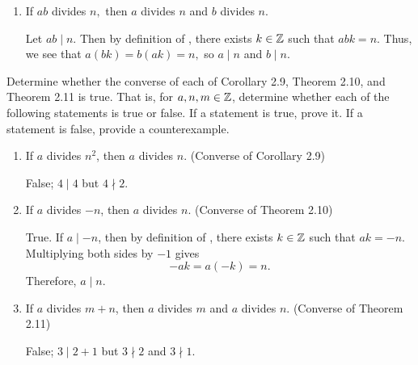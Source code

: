 \documentclass{../ximera}
\begin{document}
\begin{pre}
\begin{problem}[Problem 2.8]
\begin{enumerate}
            \item If $ab$ divides $n,$ then $a$ divides $n$ and $b$ divides $n$.
              \begin{solution}
                Let $ab\mid n$. Then by definition of , there exists $k\in\mathbb Z$ such that $abk=n$. Thus, we see that $a(bk)=b(ak)=n,$ so $a\mid n$ and $b\mid n$. 
              \end{solution}
          \end{enumerate}
        \end{problem}
    
        \begin{problem}[Problem 2.12] Determine whether the converse of each of Corollary 2.9, Theorem 2.10, and Theorem 2.11 is true. That is, for $a,n,m\in\mathbb Z$, determine whether each of the following statements is true or false. If a statement is true, prove it. If a statement is false, provide a counterexample.
        \begin{enumerate}%
          \item If $a$ divides $n^2$, then $a$ divides $n$. (Converse of Corollary 2.9)
          \begin{solution}
            False; $4\mid 4$ but $4\nmid 2$.
          \end{solution}

          \item If $a$ divides $-n$, then $a$ divides $n$. (Converse of Theorem 2.10)
            \begin{solution}
              True. If $a\mid -n$, then by definition of , there exists $k\in\mathbb Z$ such that $ak=-n$. Multiplying both sides by $-1$ gives \[-ak=a(-k)=n.\] Therefore, $a\mid n$.
            \end{solution}

          \item If $a$ divides $m+n$, then $a$ divides $m$ and $a$ divides $n$.
          (Converse of Theorem 2.11)
 
            \begin{solution}
              False; $3\mid 2+1$ but $3\nmid 2$ and $3\nmid 1$.
            \end{solution}
        \end{enumerate}
    \end{problem}
\end{pre}

 
\end{document}
